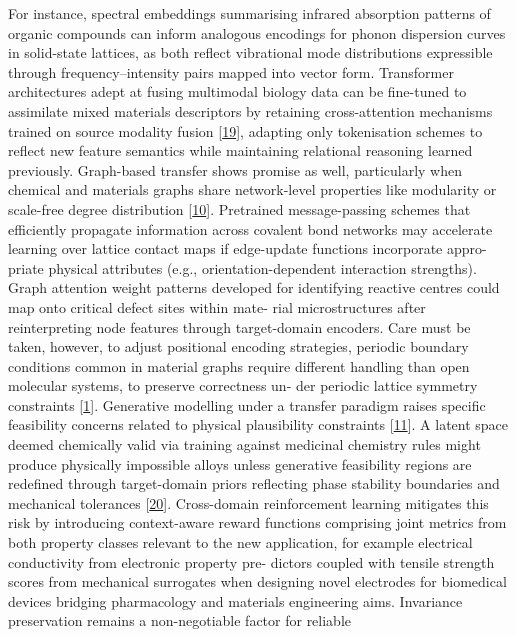 \documentclass[
]{article}
\begin{document}
For instance, spectral embeddings summarising infrared absorption
patterns of organic compounds can inform analogous encodings for phonon
dispersion curves in solid-state lattices, as both reflect vibrational
mode distributions expressible through frequency--intensity pairs mapped
into vector form. Transformer architectures adept at fusing multimodal
biology data can be fine-tuned to assimilate mixed materials descriptors
by retaining cross-attention mechanisms trained on source modality
fusion {[}\hyperref[_bookmark59]{19}{]}, adapting only tokenisation
schemes to reflect new feature semantics while maintaining relational
reasoning learned previously. Graph-based transfer shows promise as
well, particularly when chemical and materials graphs share
network-level properties like modularity or scale-free degree
distribution {[}\hyperref[_bookmark50]{10}{]}. Pretrained
message-passing schemes that efficiently propagate information across
covalent bond networks may accelerate learning over lattice contact maps
if edge-update functions incorporate appro- priate physical attributes
(e.g., orientation-dependent interaction strengths). Graph attention
weight patterns developed for identifying reactive centres could map
onto critical defect sites within mate- rial microstructures after
reinterpreting node features through target-domain encoders. Care must
be taken, however, to adjust positional encoding strategies, periodic
boundary conditions common in material graphs require different handling
than open molecular systems, to preserve correctness un- der periodic
lattice symmetry constraints {[}\hyperref[_bookmark41]{1}{]}. Generative
modelling under a transfer paradigm raises specific feasibility concerns
related to physical plausibility constraints
{[}\hyperref[_bookmark51]{11}{]}. A latent space deemed chemically valid
via training against medicinal chemistry rules might produce physically
impossible alloys unless generative feasibility regions are redefined
through target-domain priors reflecting phase stability boundaries and
mechanical tolerances {[}\hyperref[_bookmark60]{20}{]}. Cross-domain
reinforcement learning mitigates this risk by introducing context-aware
reward functions comprising joint metrics from both property classes
relevant to the new application, for example electrical conductivity
from electronic property pre- dictors coupled with tensile strength
scores from mechanical surrogates when designing novel electrodes for
biomedical devices bridging pharmacology and materials engineering aims.
Invariance preservation remains a non-negotiable factor for reliable
\end{document}
